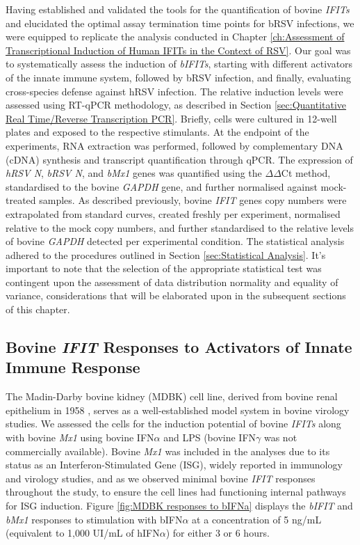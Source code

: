 Having established and validated the tools for the quantification of bovine \textit{IFITs} and elucidated the optimal assay termination time points for bRSV infections, we were equipped to replicate the analysis conducted in Chapter \ref{ch:Assessment of Transcriptional Induction of Human IFITs in the Context of RSV}. Our goal was to systematically assess the induction of \textit{bIFITs}, starting with different activators of the innate immune system, followed by bRSV infection, and finally, evaluating cross-species defense against hRSV infection. The relative induction levels were assessed using RT-qPCR methodology, as described in Section \ref{sec:Quantitative Real Time/Reverse Transcription PCR}. Briefly, cells were cultured in 12-well plates and exposed to the respective stimulants. At the endpoint of the experiments, RNA extraction was performed, followed by complementary DNA (cDNA) synthesis and transcript quantification through qPCR. The expression of \textit{hRSV N}, \textit{bRSV N}, and \textit{bMx1} genes was quantified using the \(\Delta\)\(\Delta\)Ct method, standardised to the bovine \textit{GAPDH} gene, and further normalised against mock-treated samples. As described previously, bovine \textit{IFIT} genes copy numbers were extrapolated from standard curves, created freshly per experiment, normalised relative to the mock copy numbers, and further standardised to the relative levels of bovine \textit{GAPDH} detected per experimental condition. The statistical analysis adhered to the procedures outlined in Section \ref{sec:Statistical Analysis}. It's important to note that the selection of the appropriate statistical test was contingent upon the assessment of data distribution normality and equality of variance, considerations that will be elaborated upon in the subsequent sections of this chapter.

\subsection{Bovine \textit{IFIT} Responses to Activators of Innate Immune Response} \label{subsec:Bovine IFIT Responses to Activators of Innate Immune Response}
The Madin-Darby bovine kidney (MDBK) cell line, derived from bovine renal epithelium in 1958 \cite{Madin1958EstablishedOrigin.}, serves as a well-established model system in bovine virology studies. We assessed the cells for the induction potential of bovine \textit{IFITs} along with bovine \textit{Mx1} using bovine IFN\(\alpha\) and LPS (bovine IFN\(\gamma\) was not commercially available). Bovine \textit{Mx1} was included in the analyses due to its status as an Interferon-Stimulated Gene (ISG), widely reported in immunology and virology studies, and as we observed minimal bovine \textit{IFIT} responses throughout the study, to ensure the cell lines had functioning internal pathways for ISG induction. Figure \ref{fig:MDBK responses to bIFNa} displays the \textit{bIFIT} and \textit{bMx1} responses to stimulation with bIFN\(\alpha\) at a concentration of 5 ng/mL (equivalent to 1,000 UI/mL of hIFN\(\alpha\)) for either 3 or 6 hours.

